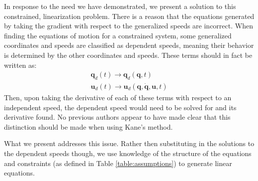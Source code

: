 \documentclass[smallcondensed,final]{svjour3}                     %
\begin{document}
In response to the need we have demonstrated, we present a solution to this
constrained, linearization problem.
There is a reason that the equations generated by taking the gradient with
respect to the generalized speeds are incorrect.
When finding the equations of motion for a constrained system, some generalized
coordinates and speeds are classified as dependent speeds, meaning their
behavior is determined by the other coordinates and speeds.
These terms should in fact be written as:
\begin{align}
\label{eq:q_d_redefined}
\mathbf{q}_d (t) \to \mathbf{q}_d (\mathbf{q}, t) \\
\label{eq:u_d_redefined}
\mathbf{u}_d (t) \to \mathbf{u}_d (\mathbf{q}, \dot{\mathbf{q}}, \mathbf{u}, t)
\end{align}
Then, upon taking the derivative of each of these terms with respect to an
independent speed, the dependent speed would need to be solved for and its
derivative found.
No previous authors appear to have made clear that this distinction should be
made when using Kane's method.

What we present addresses this issue.
Rather then substituting in the solutions to the dependent speeds though, we
use knowledge of the structure of the equations and constraints (as defined in
Table \ref{table:assumptions}) to generate linear equations.
\end{document}

